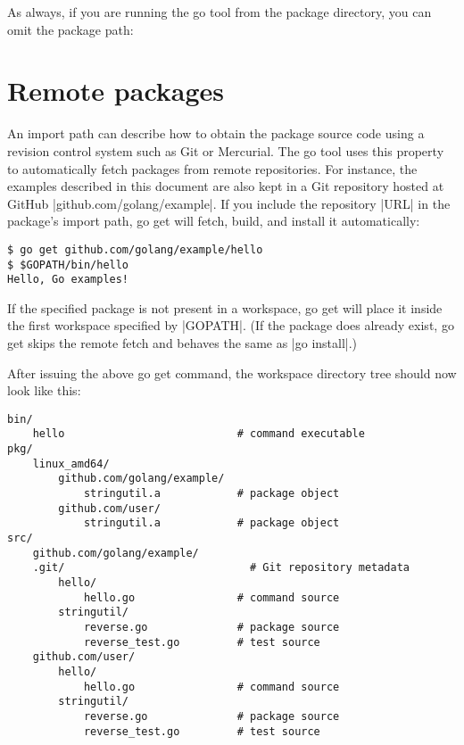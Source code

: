 As always, if you are running the go tool from the package directory, you can omit the package path:



\section{Remote packages}

An import path can describe how to obtain the package source code using a revision control system such as Git or Mercurial. The go tool uses this property to automatically fetch packages from remote repositories. For instance, the examples described in this document are also kept in a Git repository hosted at GitHub |github.com/golang/example|. If you include the repository |URL| in the package's import path, go get will fetch, build, and install it automatically:

\begin{verbatim}
$ go get github.com/golang/example/hello
$ $GOPATH/bin/hello
Hello, Go examples!
\end{verbatim}

If the specified package is not present in a workspace, go get will place it inside the first workspace specified by |GOPATH|. (If the package does already exist, go get skips the remote fetch and behaves the same as |go install|.)

After issuing the above go get command, the workspace directory tree should now look like this:

\begin{verbatim}
bin/
    hello                           # command executable
pkg/
    linux_amd64/
        github.com/golang/example/
            stringutil.a            # package object
        github.com/user/
            stringutil.a            # package object
src/
    github.com/golang/example/
	.git/                             # Git repository metadata
        hello/
            hello.go                # command source
        stringutil/
            reverse.go              # package source
            reverse_test.go         # test source
    github.com/user/
        hello/
            hello.go                # command source
        stringutil/
            reverse.go              # package source
            reverse_test.go         # test source
\end{verbatim}

